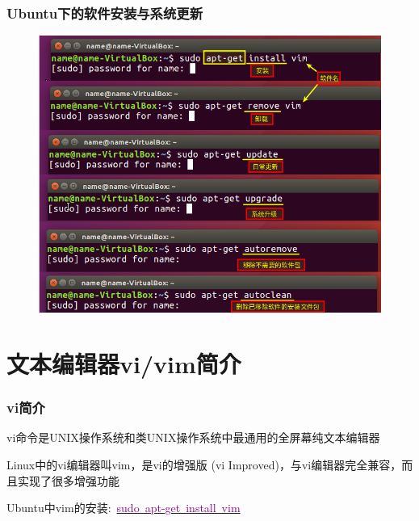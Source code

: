 \frame
{
	\frametitle{\textrm{Ubuntu}下的软件安装与系统更新}
\begin{figure}[h!]
\centering
\vspace{-11.5pt}
\includegraphics[height=0.74\textwidth]{Figures/Ubuntu-apt-get.png}
\label{Ubuntu-apt-get}
\end{figure}
}

\section{文本编辑器\rm{vi/vim}简介}
\frame
{
	\frametitle{\textrm{vi}简介}
	\textrm{vi}命令是\textrm{UNIX}操作系统和类\textrm{UNIX}操作系统中最通用的全屏幕纯文本编辑器

	\textrm{Linux}中的\textrm{vi}编辑器叫\textrm{vim}，是\textrm{vi}的增强版 \textrm{(vi Improved)}，与\textrm{vi}编辑器完全兼容，而且实现了很多增强功能
	
	\textrm{Ubuntu}中\textrm{vim}的安装:~\underline{\textcolor{purple}{sudo~apt-get~install~vim}}
\begin{figure}[h!]
\centering
\vspace*{0.1in}
\label{vim-open}
\end{figure} 
}

